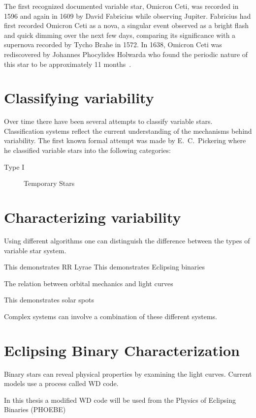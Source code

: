 The first recognized documented variable star, Omicron Ceti,  was recorded in 1596 and again in 1609 by David Fabricius while observing Jupiter.
Fabricius had first recorded Omicron Ceti as a nova, a singular event observed as a bright flash and quick dimming over the next few days,
comparing its significance with a supernova recorded by Tycho Brahe in 1572.
In 1638, Omicron Ceti was rediscovered by Johannes Phocylides Holwarda who found the periodic nature of this star to be approximately 11 months~\cite{hockey_2007}.


\section{Classifying variability}
Over time there have been several attempts to classify variable stars.
Classification systems reflect the current understanding of the mechanisms behind variability.
The first known formal attempt was made by E.\ C.\ Pickering\cite{sterken_1996, hoffleit_1972} where he classified variable stars into the following categories:
\begin{description}
    \item [Type I] Temporary Stars
\end{description}

\section{Characterizing variability}
Using different algorithms one can distinguish the difference between the types of variable star system.

This demonstrates RR Lyrae
This demonstrates Eclipsing binaries

The relation between orbital mechanics and light curves

This demonstrates solar spots

Complex systems can involve a combination of these different systems.

\section{Eclipsing Binary Characterization}
Binary stars can reveal physical properties by examining the light curves.
Current models use a process called WD code.

In this thesis a modified WD code will be used from the Physics of Eclipsing Binaries (PHOEBE)

